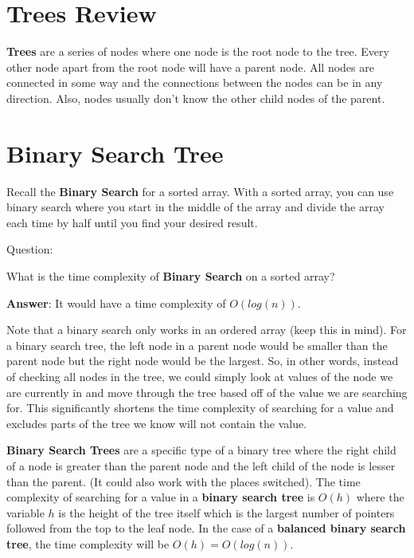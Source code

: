 \documentclass[11pt,a4paper,english]{report}
\begin{document}
\section{Trees Review}

\textbf{Trees} are a series of nodes where one node is the root node to the tree. Every other node apart from the root node will have a parent node. All nodes are connected in some way and the connections between the nodes can be in any direction. Also, nodes usually don't know the other child nodes of the parent.

\bigskip
\bigskip

\section{Binary Search Tree}

Recall the \textbf{Binary Search} for a sorted array. With a sorted array, you can use binary search where you start in the middle of the array and divide the array each time by half until you find your desired result.

\bigskip
\begin{gbox}{Question:} {

    What is the time complexity of \textbf{Binary Search} on a sorted array?

    \bigskip
    \textbf{Answer}: It would have a time complexity of $O(log(n))$.

}\end{gbox}

\bigskip

\noindent Note that a binary search only works in an ordered array (keep this in mind). For a binary search tree, the left node in a parent node would be smaller than the parent node but the right node would be the largest. So, in other words, instead of checking all nodes in the tree, we could simply look at values of the node we are currently in and move through the tree based off of the value we are searching for. This significantly shortens the time complexity of searching for a value and excludes parts of the tree we know will not contain the value.

\bigskip\noindent
\textbf{Binary Search Trees} are a specific type of a binary tree where the right child of a node is greater than the parent node and the left child of the node is lesser than the parent. (It could also work with the places switched). The time complexity of searching for a value in a \textbf{binary search tree} is $O(h)$ where the variable $h$ is the height of the tree itself which is the largest number of pointers followed from the top to the leaf node. In the case of a \textbf{balanced binary search tree}, the time complexity will be $O(h) = O(log(n))$.
\end{document}

